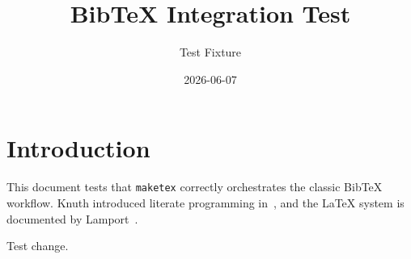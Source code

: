 \documentclass{article}
\title{BibTeX Integration Test}
\author{Test Fixture}
\date{2026-06-07}
\begin{document}
\maketitle

\section{Introduction}

This document tests that \texttt{maketex} correctly orchestrates the classic
BibTeX workflow. Knuth introduced literate programming in~\cite{knuth1984literate},
and the \LaTeX{} system is documented by Lamport~\cite{lamport1994latex}.

Test change.



\end{document}

